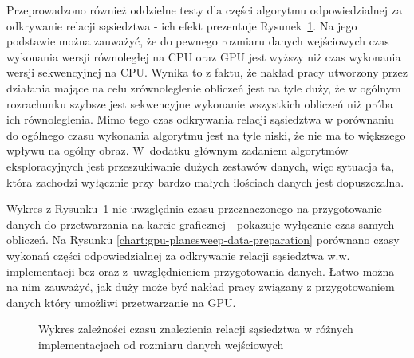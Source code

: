 \documentclass[12pt]{article}
\begin{document}
Przeprowadzono również oddzielne testy dla części algorytmu odpowiedzialnej za odkrywanie relacji sąsiedztwa - ich efekt prezentuje Rysunek~\ref{chart:planesweep-datasize}. Na jego podstawie można zauważyć, że do pewnego rozmiaru danych wejściowych czas wykonania wersji równoległej na CPU oraz GPU jest wyższy niż czas wykonania wersji sekwencyjnej na CPU. Wynika to z faktu, że nakład pracy utworzony przez działania mające na celu zrównoleglenie obliczeń jest na tyle duży, że w ogólnym rozrachunku szybsze jest sekwencyjne wykonanie wszystkich obliczeń niż próba ich równoleglenia. Mimo tego czas odkrywania relacji sąsiedztwa w porównaniu do ogólnego czasu wykonania algorytmu jest na tyle niski, że nie ma to większego wpływu na ogólny obraz. W~dodatku głównym zadaniem algorytmów eksploracyjnych jest przeszukiwanie dużych zestawów danych, więc sytuacja ta, która zachodzi wyłącznie przy bardzo małych ilościach danych jest dopuszczalna.

Wykres z Rysunku~\ref{chart:planesweep-datasize} nie uwzględnia czasu przeznaczonego na przygotowanie danych do przetwarzania na karcie graficznej - pokazuje wyłącznie czas samych obliczeń. Na Rysunku \ref{chart:gpu-planesweep-data-preparation} porównano czasy wykonań części odpowiedzialnej za odkrywanie relacji sąsiedztwa w.w. implementacji bez oraz z~uwzględnieniem przygotowania danych. Łatwo można na nim zauważyć, jak duży może być nakład pracy związany z przygotowaniem danych który umożliwi przetwarzanie na GPU.
\begin{figure}[H]
\caption{Wykres zależności czasu znalezienia relacji sąsiedztwa w różnych implementacjach od rozmiaru danych wejściowych}
\label{chart:planesweep-datasize}
\end{figure}
\end{document}
